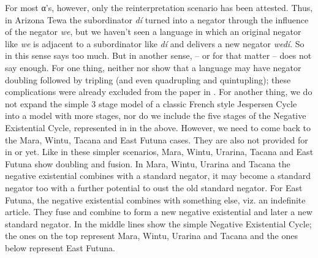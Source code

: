 ﻿\documentclass[output=paper,draft,draftmode,colorlinks,citecolor=brown]{langscibook}
\begin{document}
For most α's, however, only the reinterpretation scenario has been
attested. Thus, in Arizona Tewa the subordinator \textit{dí} turned into a
negator through the influence of the negator \textit{we}, but we haven't
seen a language in which an original negator like \textit{we} is adjacent
to a subordinator like \textit{dí} and delivers a new negator
\textit{wedí}. So in this sense  says too much. But in
another sense,  -- or
 for that matter -- does
not say enough. For one thing, neither  nor
show that a language may have negator doubling followed by tripling (and
even quadrupling and quintupling); these complications were already excluded from the
paper in . For another thing, we do not expand
the simple 3 stage model of a classic French style Jespersen Cycle into a
model with more stages, nor do we include the five stages of the Negative
Existential Cycle, represented in  in the above.
However, we need to come back to the Mara, Wintu,
Tacana and East Futuna cases. They are also not
provided for in  or
 yet. Like
in these simpler scenarios, Mara, Wintu, Urarina, Tacana and East Futuna
show doubling and fusion. In Mara, Wintu, Urarina and Tacana the negative
existential combines with a standard negator, it may become a standard
negator too with a further potential to oust the old standard negator. For
East Futuna, the negative existential combines with something else, viz. an
indefinite article. They fuse and combine to form a new negative
existential and later a new standard negator. In  the middle
lines show the simple Negative Existential Cycle; the ones on the top
represent Mara, Wintu, Urarina and Tacana and the ones below represent East
Futuna.
\end{document}
